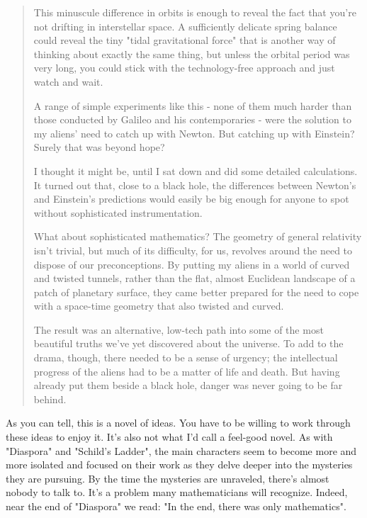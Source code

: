 \begin{quote}
  This minuscule difference in orbits is enough to reveal the fact that
  you're not drifting in interstellar space.  A sufficiently delicate 
  spring balance could reveal the tiny "tidal gravitational force" 
  that is another way of thinking about exactly the same thing, but 
  unless the orbital period was very long, you could stick with the 
  technology-free approach and just watch and wait.

  A range of simple experiments like this - none of them much harder 
  than those conducted by Galileo and his contemporaries - were the 
  solution to my aliens' need to catch up with Newton.  But catching 
  up with Einstein?  Surely that was beyond hope?

  I thought it might be, until I sat down and did some detailed 
  calculations.  It turned out that, close to a black hole, the 
  differences between Newton's and Einstein's predictions would easily 
  be big enough for anyone to spot without sophisticated instrumentation.

  What about sophisticated mathematics?  The geometry of general 
  relativity isn't trivial, but much of its difficulty, for us, 
  revolves around the need to dispose of our preconceptions.  By 
  putting my aliens in a world of curved and twisted tunnels, rather 
  than the flat, almost Euclidean landscape of a patch of planetary 
  surface, they came better prepared for the need to cope with a 
  space-time geometry that also twisted and curved.

  The result was an alternative, low-tech path into some of the most 
  beautiful truths we've yet discovered about the universe.  To add 
  to the drama, though, there needed to be a sense of urgency; the 
  intellectual progress of the aliens had to be a matter of life and 
  death.  But having already put them beside a black hole, danger was 
  never going to be far behind.
\end{quote}

As you can tell, this is a novel of ideas.  You have to be willing to
work through these ideas to enjoy it.  It's also not what I'd call
a feel-good novel.  As with "Diaspora" and 
"Schild's Ladder", the main characters seem to become more and 
more isolated and focused on their work as they delve deeper into the 
mysteries they are pursuing.  By the time the mysteries are unraveled,
there's almost nobody to talk to.  It's a problem many mathematicians 
will recognize.  Indeed, near the end of "Diaspora" we read: 
"In the end, there was only mathematics".  
 

